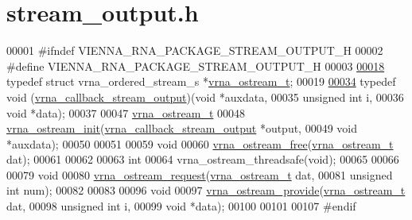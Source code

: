 \hypertarget{datastructures_2stream__output_8h_source}{}\section{stream\+\_\+output.\+h}
\label{datastructures_2stream__output_8h_source}

\begin{DoxyCode}
00001 \textcolor{preprocessor}{#ifndef VIENNA\_RNA\_PACKAGE\_STREAM\_OUTPUT\_H}
00002 \textcolor{preprocessor}{#define VIENNA\_RNA\_PACKAGE\_STREAM\_OUTPUT\_H}
00003 
\hyperlink{group__buffer__utils_ga8da189552af21ab6e4e88bdcc240870c}{00018} \textcolor{keyword}{typedef} \textcolor{keyword}{struct }vrna\_ordered\_stream\_s *\hyperlink{group__buffer__utils_ga8da189552af21ab6e4e88bdcc240870c}{vrna\_ostream\_t};
00019 
\hyperlink{group__buffer__utils_ga4adb94338a6f0a1a451e03c1bdac0d9d}{00034} \textcolor{keyword}{typedef} void (\hyperlink{group__buffer__utils_ga4adb94338a6f0a1a451e03c1bdac0d9d}{vrna\_callback\_stream\_output})(\textcolor{keywordtype}{void}         *auxdata,
00035                                            \textcolor{keywordtype}{unsigned} \textcolor{keywordtype}{int} i,
00036                                            \textcolor{keywordtype}{void}         *data);
00037 
00047 \hyperlink{group__buffer__utils_ga8da189552af21ab6e4e88bdcc240870c}{vrna\_ostream\_t}
00048 \hyperlink{group__buffer__utils_gad23113e66a0910ec2341856e2da56bf6}{vrna\_ostream\_init}(\hyperlink{group__buffer__utils_ga4adb94338a6f0a1a451e03c1bdac0d9d}{vrna\_callback\_stream\_output} *output,
00049                   \textcolor{keywordtype}{void}                        *auxdata);
00050 
00051 
00059 \textcolor{keywordtype}{void}
00060 \hyperlink{group__buffer__utils_gaf813ec90e1446ba82c89f9a39688a3b3}{vrna\_ostream\_free}(\hyperlink{group__buffer__utils_ga8da189552af21ab6e4e88bdcc240870c}{vrna\_ostream\_t} dat);
00061 
00062 
00063 \textcolor{keywordtype}{int}
00064 vrna\_ostream\_threadsafe(\textcolor{keywordtype}{void});
00065 
00066 
00079 \textcolor{keywordtype}{void}
00080 \hyperlink{group__buffer__utils_gaebca91932705d71bcbf00bd8d82bd7c8}{vrna\_ostream\_request}(\hyperlink{group__buffer__utils_ga8da189552af21ab6e4e88bdcc240870c}{vrna\_ostream\_t} dat,
00081                      \textcolor{keywordtype}{unsigned} \textcolor{keywordtype}{int}   num);
00082 
00083 
00096 \textcolor{keywordtype}{void}
00097 \hyperlink{group__buffer__utils_ga6253c42abdeaf3b41a38204865e1f0f7}{vrna\_ostream\_provide}(\hyperlink{group__buffer__utils_ga8da189552af21ab6e4e88bdcc240870c}{vrna\_ostream\_t} dat,
00098                      \textcolor{keywordtype}{unsigned} \textcolor{keywordtype}{int}   i,
00099                      \textcolor{keywordtype}{void}           *data);
00100 
00101 
00107 \textcolor{preprocessor}{#endif}
\end{DoxyCode}
